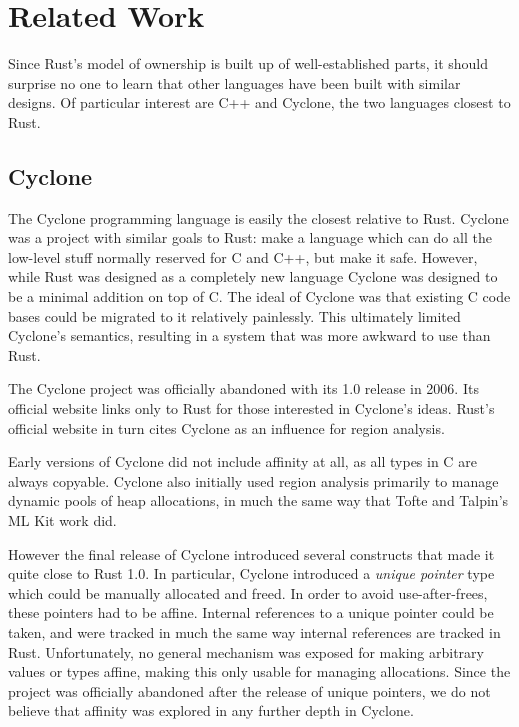 \chapter{Related Work}
\label{ch:related}

Since Rust's model of ownership is built up of well-established parts, it should
surprise no one to learn that other languages have been built with similar
designs. Of particular interest are C++ and Cyclone, the two languages closest
to Rust.




\section{Cyclone}

The Cyclone programming language is easily the closest relative to Rust. Cyclone
was a project with similar goals to Rust: make a language which can do all the
low-level stuff normally reserved for C and C++, but make it safe. However, while
Rust was designed as a completely new language Cyclone was designed to be a
minimal addition on top of C. The ideal of Cyclone was that existing C code
bases could be migrated to it relatively painlessly. This ultimately limited
Cyclone's semantics, resulting in a system that was more awkward to use than
Rust.

The Cyclone project was officially abandoned with its 1.0 release in 2006.
Its official website links only to Rust for those interested in Cyclone's ideas.
Rust's official website in turn cites Cyclone as an influence for region analysis.

Early versions of Cyclone did not include affinity at all, as all types in C
are always copyable. Cyclone also initially used region analysis primarily to
manage dynamic pools of heap allocations, in much the same way that Tofte and Talpin's
ML Kit work did.

However the final release of Cyclone introduced several constructs
that made it quite close to Rust 1.0. In particular, Cyclone introduced
a \emph{unique pointer} type which could be manually allocated and freed. In order
to avoid use-after-frees, these pointers had to be affine. Internal references to a
unique pointer could be taken, and were tracked in much the same way internal references are
tracked in Rust. Unfortunately, no general mechanism was exposed for making arbitrary
values or types affine, making this only usable for managing allocations.
Since the project was officially abandoned after the release of unique pointers, we
do not believe that affinity was explored in any further depth in Cyclone.






